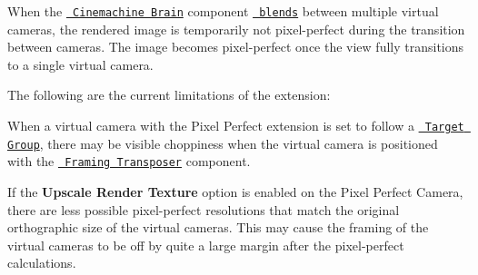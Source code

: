 When the \href{https://docs.unity3d.com/Packages/com.unity.cinemachine@2.3/manual/CinemachineBrainProperties.html}{\texttt{ Cinemachine Brain}} component \href{https://docs.unity3d.com/Packages/com.unity.cinemachine@2.3/manual/CinemachineBlending.html}{\texttt{ blends}} between multiple virtual cameras, the rendered image is temporarily not pixel-\/perfect during the transition between cameras. The image becomes pixel-\/perfect once the view fully transitions to a single virtual camera.

The following are the current limitations of the extension\+:


\begin{DoxyItemize}
\item When a virtual camera with the Pixel Perfect extension is set to follow a \href{https://docs.unity3d.com/Packages/com.unity.cinemachine@2.3/manual/CinemachineTargetGroup.html}{\texttt{ Target Group}}, there may be visible choppiness when the virtual camera is positioned with the \href{https://docs.unity3d.com/Packages/com.unity.cinemachine@2.9/manual/CinemachineBodyFramingTransposer.html}{\texttt{ Framing Transposer}} component.
\item If the {\bfseries{Upscale Render Texture}} option is enabled on the Pixel Perfect Camera, there are less possible pixel-\/perfect resolutions that match the original orthographic size of the virtual cameras. This may cause the framing of the virtual cameras to be off by quite a large margin after the pixel-\/perfect calculations. 
\end{DoxyItemize}
